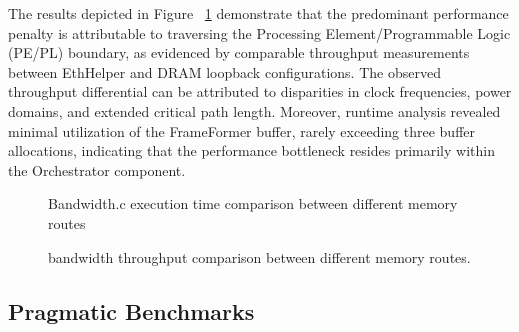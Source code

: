 The results depicted in Figure ~\ref{fig:bandwidth_result} demonstrate that the predominant performance penalty is attributable to traversing the Processing Element/Programmable Logic (PE/PL) boundary, as evidenced by comparable throughput measurements between EthHelper and DRAM loopback configurations. The observed throughput differential can be attributed to disparities in clock frequencies, power domains, and extended critical path length. Moreover, runtime analysis revealed minimal utilization of the FrameFormer buffer, rarely exceeding three buffer allocations, indicating that the performance bottleneck resides primarily within the Orchestrator component.


\begin{figure}
            \centering
            
            \caption{Bandwidth.c execution time comparison between different memory routes}
            \label{fig:bandwidth_result}
\end{figure}

\begin{figure}
  \centering
  
  \caption{bandwidth throughput comparison between different memory routes.}
  \label{fig:bandwidth_throughput_result}
\end{figure}


\subsection{Pragmatic Benchmarks}


